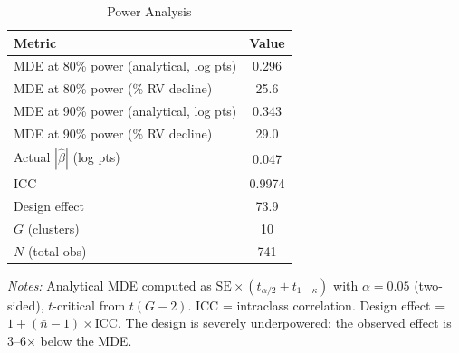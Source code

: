 \begin{table}[htbp]
  \centering
  \caption{Power Analysis}\label{tab:power}
  \begin{threeparttable}
    \begin{tabular}{l S[table-format=2.3]}
      \toprule
      {Metric} & {Value} \\
      \midrule
      MDE at 80\% power (analytical, log pts) & 0.296 \\
      MDE at 80\% power (\% RV decline) & 25.6 \\
      MDE at 90\% power (analytical, log pts) & 0.343 \\
      MDE at 90\% power (\% RV decline) & 29.0 \\
      Actual $|\hat{\beta}|$ (log pts) & 0.047 \\
      ICC & 0.9974 \\
      Design effect & 73.9 \\
      $G$ (clusters) & 10 \\
      $N$ (total obs) & 741 \\
      \bottomrule
    \end{tabular}
    \begin{tablenotes}[flushleft]
      \small
      \item \textit{Notes:} Analytical MDE computed as $\text{SE} \times (t_{\alpha/2} + t_{1-\kappa})$
        with $\alpha = 0.05$ (two-sided), $t$-critical from $t(G-2)$. ICC = intraclass
        correlation. Design effect = $1 + (\bar{n} - 1) \times \text{ICC}$.
        The design is severely underpowered: the observed effect is 3--6$\times$ below the MDE.
    \end{tablenotes}
  \end{threeparttable}
\end{table}
